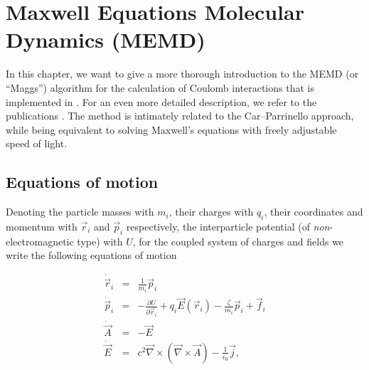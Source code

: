 %  
%   
%  
%  
%
\chapter{Maxwell Equations Molecular Dynamics (MEMD)}
\label{sec:MEMD}

In this chapter, we want to give a more thorough introduction to the
MEMD (or ``Maggs'') algorithm for the calculation of Coulomb
interactions that is implemented in \es{}. For an even more detailed
description, we refer to the publications \cite{maggs02a,
  pasichnyk04a}. The method is intimately related to the
Car--Parrinello approach, while being equivalent to solving Maxwell's
equations with freely adjustable speed of light.

\section{Equations of motion}

Denoting the particle masses with $m_i$, their charges with $q_i$,
their coordinates and momentum with $\vec r_i$ and $\vec p_i$
respectively, the interparticle potential (of {\em
  non}-electromagnetic type) with $U$, for the coupled system of
charges and fields we write the following equations of motion

\begin{eqnarray} 
  \dot{\vec r}_i & = & \frac{1}{m_i} \vec p_i \\
  \dot{\vec p}_i & = & - \frac{\partial U}{\partial \vec r_i} + q_i \vec E (\vec r_i)- \frac{\zeta}{m_i} \vec p_i
                        + \vec f_i \\
  \dot{\vec A} & = & - \vec E \\
  \dot{\vec E} & = & 
  c^2 \vec \nabla \times \left( \vec \nabla \times \vec A \right)
  - \frac{1}{\epsilon_0} \vec j ,
\end{eqnarray}

